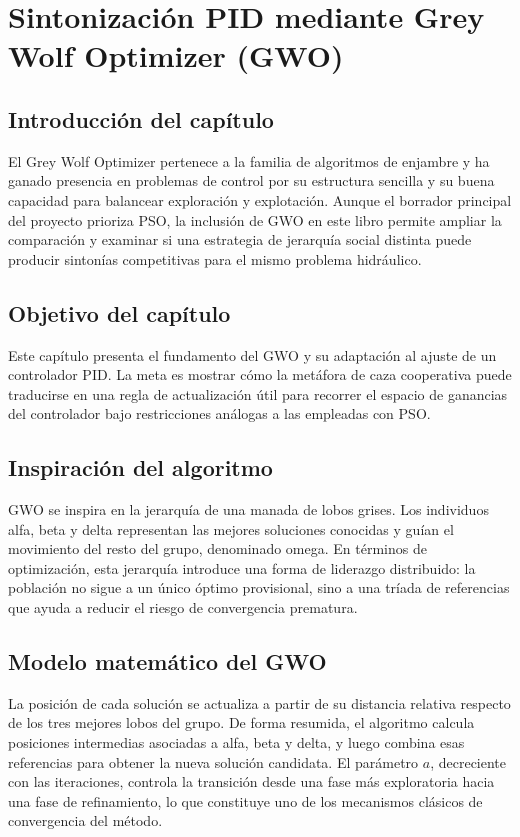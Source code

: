 \chapter{Sintonización PID mediante Grey Wolf Optimizer (GWO)}
\label{ch:gwo}

\section{Introducción del capítulo}
El Grey Wolf Optimizer pertenece a la familia de algoritmos de enjambre y ha ganado presencia
en problemas de control por su estructura sencilla y su buena capacidad para balancear
exploración y explotación. Aunque el borrador principal del proyecto prioriza PSO, la inclusión
de GWO en este libro permite ampliar la comparación y examinar si una estrategia de jerarquía
social distinta puede producir sintonías competitivas para el mismo problema hidráulico.

\section{Objetivo del capítulo}
Este capítulo presenta el fundamento del GWO y su adaptación al ajuste de un controlador PID.
La meta es mostrar cómo la metáfora de caza cooperativa puede traducirse en una regla de
actualización útil para recorrer el espacio de ganancias del controlador bajo restricciones
análogas a las empleadas con PSO.

\section{Inspiración del algoritmo}
GWO se inspira en la jerarquía de una manada de lobos grises. Los individuos alfa, beta y
delta representan las mejores soluciones conocidas y guían el movimiento del resto del grupo,
denominado omega. En términos de optimización, esta jerarquía introduce una forma de
liderazgo distribuido: la población no sigue a un único óptimo provisional, sino a una tríada de
referencias que ayuda a reducir el riesgo de convergencia prematura.

\section{Modelo matemático del GWO}
La posición de cada solución se actualiza a partir de su distancia relativa respecto de los tres
mejores lobos del grupo. De forma resumida, el algoritmo calcula posiciones intermedias
asociadas a alfa, beta y delta, y luego combina esas referencias para obtener la nueva solución
candidata. El parámetro $a$, decreciente con las iteraciones, controla la transición desde una
fase más exploratoria hacia una fase de refinamiento, lo que constituye uno de los mecanismos
clásicos de convergencia del método.

